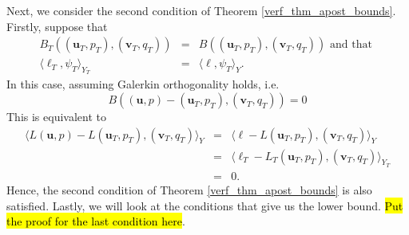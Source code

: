 \documentclass[12pt,a4paper]{article}
\theoremstyle{definition}
\begin{document}
Next, we consider the second condition of Theorem \ref{verf_thm_apost_bounds}.  Firstly, suppose that
\begin{eqnarray}
B_T\left(\left(\textbf{u}_T,p_T\right),\left(\textbf{v}_T,q_T\right)\right)&=&B\left(\left(\textbf{u}_T,p_T\right),\left(\textbf{v}_T,q_T\right)\right)\text{ and that }\\
\langle \ell_T,\psi_T \rangle_{Y_T}&=&\langle \ell,\psi_T \rangle_{Y}.
\end{eqnarray}
In this case, assuming Galerkin orthogonality holds, i.e.
\begin{equation}
B\left(\left(\textbf{u},p\right)-\left(\textbf{u}_T,p_T\right),\left(\textbf{v}_T,q_T\right)\right) = 0
\end{equation} 
This is equivalent to 
\begin{eqnarray}
\langle L\left(\textbf{u},p\right)-L\left(\textbf{u}_T,p_T\right),\left(\textbf{v}_T,q_T\right)\rangle_Y&=&\langle \ell - L\left(\textbf{u}_T,p_T\right),\left(\textbf{v}_T,q_T\right) \rangle_Y\nonumber\\
&=&\langle \ell_T - L_T\left(\textbf{u}_T,p_T\right),\left(\textbf{v}_T,q_T\right) \rangle_{Y_T}\nonumber\\
&=&0.\nonumber
\end{eqnarray}
Hence, the second condition of Theorem \ref{verf_thm_apost_bounds} is also satisfied.  Lastly, we will look at the conditions that give us the lower bound. \hl{Put the proof for the last condition here}.
\end{document}
